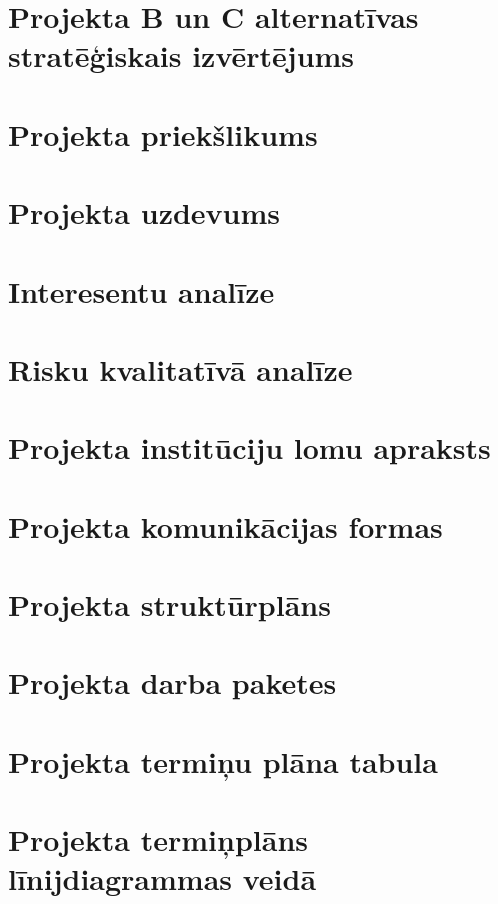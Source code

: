 \section{Projekta B un C alternatīvas stratēģiskais izvērtējums}
	\label{app:B_C_strategiskais_vertejums}
    \clearpage
\section{Projekta priekšlikums}
	\label{app:Projekta_priekslikums}
    \clearpage
\section{Projekta uzdevums}
	\label{app:Projekta_uzdevums}
    \clearpage
\section{Interesentu analīze}
	\label{app:Projekta_interesentu_analize}
    \clearpage
\section{Risku kvalitatīvā analīze}
	\label{app:Projekta_risku_analize}
    \clearpage
\section{Projekta institūciju lomu apraksts}
	\label{app:Projekta_instituciju_apraksts}
    \clearpage
\section{Projekta komunikācijas formas}
	\label{app:Projekta_komunikacijas_formas}
    \clearpage
\section{Projekta struktūrplāns}
	\label{app:Projekta_strukturplans}
    \clearpage
\section{Projekta darba paketes}
	\label{app:Projekta_darba_paketes}
    \clearpage
\section{Projekta termiņu plāna tabula}
	\label{app:Projekta_terminu_plans}
    \clearpage
\section{Projekta termiņplāns līnijdiagrammas veidā}
	\label{app:Projekta_linijdiagrammas}
    \clearpage
